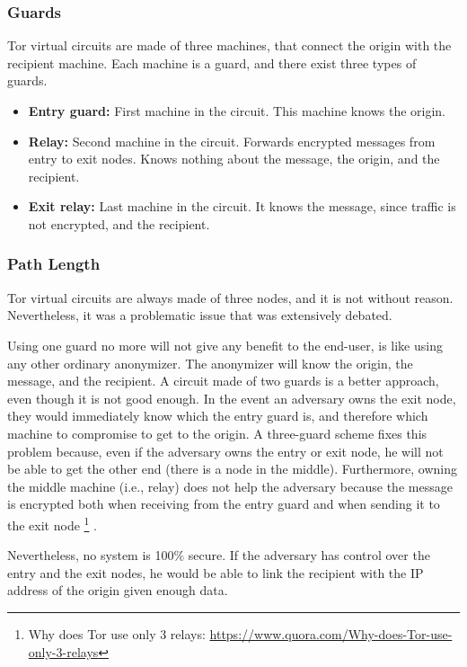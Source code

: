 \documentclass[11pt, a4paper,twoside]{tesi_upf}
\begin{document}
\subsubsection{Guards}

Tor virtual circuits are made of three machines, that connect the origin with the recipient machine. Each machine is a guard, and there exist three types of guards.

\begin{itemize}
\item\textbf{Entry guard:} First machine in the circuit. This machine knows the origin.

\item\textbf{Relay:} Second machine in the circuit. Forwards encrypted messages from entry to exit nodes. Knows nothing about the message, the origin, and the recipient.

\item\textbf{Exit relay:} Last machine in the circuit. It knows the message, since traffic is not encrypted, and the recipient.
\end{itemize}

\subsubsection{Path Length}
\label{path-length}

Tor virtual circuits are always made of three nodes, and it is not without reason. Nevertheless, it was a problematic issue that was extensively debated.

Using one guard no more will not give any benefit to the end-user, is like using any other ordinary anonymizer. The anonymizer will know the origin, the message, and the recipient.
A circuit made of two guards is a better approach, even though it is not good enough. In the event an adversary owns the exit node, they would immediately know which the entry guard is, and therefore which machine to compromise to get to the origin. A three-guard scheme fixes this problem because, even if the adversary owns the entry or exit node, he will not be able to get the other end (there is a node in the middle). Furthermore, owning the middle machine (i.e., relay) does not help the adversary because the message is encrypted both when receiving from the entry guard and when sending it to the exit node  \footnote{Why does Tor use only 3 relays: \url{https://www.quora.com/Why-does-Tor-use-only-3-relays}} \cite{master-tor-circuit}.

Nevertheless, no system is 100\% secure. If the adversary has control over the entry and the exit nodes, he would be able to link the recipient with the IP address of the origin given enough data.
\end{document}
